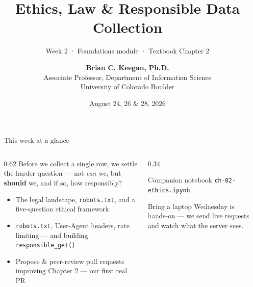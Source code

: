\documentclass[9pt,aspectratio=169]{beamer}
\title[Week 2 · Ethics \& Law]{{\Huge Ethics, Law \& Responsible Data Collection}}
\subtitle{Week 2 · Foundations module · Textbook Chapter 2}
\author[Keegan]{\textbf{Brian C. Keegan, Ph.D.} \\ Associate Professor, Department of Information Science \\ University of Colorado Boulder}
\date{August 24, 26 \& 28, 2026}
\begin{document}
\maketitle

\begin{frame}{This week at a glance}
    \begin{columns}[T]
        \begin{column}{0.62\textwidth}
            Before we collect a single row, we settle the harder question --- not \textit{can} we, but \textbf{should} we, and if so, how responsibly?

            \vspace{1em}

            \begin{itemize}\small
                \item The legal landscape, \texttt{robots.txt}, and a five-question ethical framework
            \end{itemize}

            \vspace{0.5em}

            \begin{itemize}\small
                \item \texttt{robots.txt}, User-Agent headers, rate limiting --- and building \texttt{responsible\_get()}
            \end{itemize}

            \vspace{0.5em}

            \begin{itemize}\small
                \item Propose \& peer-review pull requests improving Chapter 2 --- our first real PR
            \end{itemize}
        \end{column}
        \begin{column}{0.34\textwidth}
            \begin{block}{Companion notebook}
                \footnotesize \texttt{ch-02-ethics.ipynb}
            \end{block}
            \begin{alertblock}{Bring a laptop}
                \footnotesize Wednesday is hands-on --- we send live requests and watch what the server sees.
            \end{alertblock}
        \end{column}
    \end{columns}
\end{frame}
\end{document}
